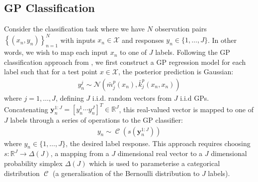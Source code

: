 \documentclass{article}
\newcommand{\Cat}{\operatorname{\mathcal{C}}}
\numberwithin{equation}{section}
\begin{document}
\subsection{GP Classification}
Consider the classification task where we have $N$ observation pairs $\left\{(x_n, y_n)\right\}_{n=1}^{N}$ with inputs $x_n \in \mathcal{X}$ and responses $y_n \in \{1, \dots, J\}$. In other words, we wish to map each input $x_n$ to one of $J$ labels. Following the GP classification approach from \cite{matthews2017scalable}, we first construct a GP regression model for each label such that for a test point $x \in \mathcal{X}$, the posterior prediction is Gaussian:
\begin{align}
    y_n^j \sim \mathcal{N}\left(\bar{m}^p_j(x_n), \bar{k}^p_j(x_n, x_n)\right)
    \label{gp-classifier-regressors}
\end{align}
where $j=1, \dots, J$, defining $J$ i.i.d. random vectors from $J$ i.i.d GPs.
Concatenating $\mathbf{y}_n^{1:J} = [y_n^1 \cdots y_n^J]^T \in \mathbb{R}^{J}$, this real-valued vector is mapped to one of $J$ labels through a series of operations to the GP classifier:
\begin{align}
y_n \sim \Cat \left(s\left(\mathbf{y}_n^{1:J}\right)\right)
\label{gp-classifier}
\end{align}
where $y_n \in \{1, \dots, J\}$, the desired label response. This approach requires choosing $s: \mathbb{R}^J \rightarrow \Delta(J)$, a mapping from a $J$ dimensional real vector to a $J$ dimensional probability simplex $\Delta(J)$ which is used to parameterise a categorical distribution $\Cat$ (a generalisation of the Bernoulli distribution to $J$ labels).
\end{document}
